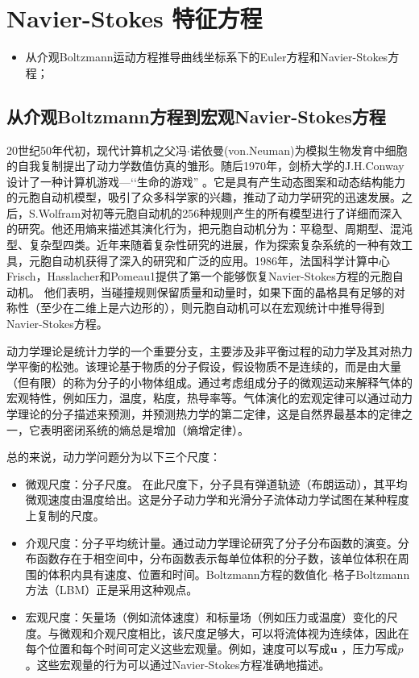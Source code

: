 \documentclass[MathematicsNumericsDerivationsAndOpenFOAM.tex]{subfiles}
\begin{document}


\chapter{Navier-Stokes 特征方程 }
\label{CHAPTER::Characteristic}

%
%
%
\begin{itemize}
  \item 从介观Boltzmann运动方程推导曲线坐标系下的Euler方程和Navier-Stokes方程；
\end{itemize}



\section{从介观Boltzmann方程到宏观Navier-Stokes方程}


20世纪50年代初，现代计算机之父冯$\cdot$诺依曼(von.Neuman)为模拟生物发育中细胞的自我复制提出了动力学数值仿真的雏形。随后1970年，剑桥大学的J.H.Conway设计了一种计算机游戏—‘‘生命的游戏” 。它是具有产生动态图案和动态结构能力的元胞自动机模型，吸引了众多科学家的兴趣，推动了动力学研究的迅速发展。之后，S.Wolfram对初等元胞自动机的256种规则产生的所有模型进行了详细而深入的研究。他还用熵来描述其演化行为，把元胞自动机分为：平稳型、周期型、混沌型、复杂型四类。近年来随着复杂性研究的进展，作为探索复杂系统的一种有效工具，元胞自动机获得了深入的研究和广泛的应用。1986年，法国科学计算中心Frisch，Hasslacher和Pomeau1提供了第一个能够恢复Navier-Stokes方程的元胞自动机。 他们表明，当碰撞规则保留质量和动量时，如果下面的晶格具有足够的对称性（至少在二维上是六边形的），则元胞自动机可以在宏观统计中推导得到Navier-Stokes方程。

动力学理论是统计力学的一个重要分支，主要涉及非平衡过程的动力学及其对热力学平衡的松弛。该理论基于物质的分子假设，假设物质不是连续的，而是由大量（但有限）的称为分子的小物体组成。通过考虑组成分子的微观运动来解释气体的宏观特性，例如压力，温度，粘度，热导率等。气体演化的宏观定律可以通过动力学理论的分子描述来预测，并预测热力学的第二定律，这是自然界最基本的定律之一，它表明密闭系统的熵总是增加（熵增定律）。


总的来说，动力学问题分为以下三个尺度：
\begin{itemize}
  \item  微观尺度：分子尺度。 在此尺度下，分子具有弹道轨迹（布朗运动），其平均微观速度由温度给出。这是分子动力学和光滑分子流体动力学试图在某种程度上复制的尺度。

  \item 介观尺度：分子平均统计量。通过动力学理论研究了分子分布函数的演变。分布函数存在于相空间中，分布函数表示每单位体积的分子数，该单位体积在周围的体积内具有速度、位置和时间。Boltzmann方程的数值化--格子Boltzmann方法（LBM）正是采用这种观点。

  \item  宏观尺度：矢量场（例如流体速度）和标量场（例如压力或温度）变化的尺度。与微观和介观尺度相比，该尺度足够大，可以将流体视为连续体，因此在每个位置和每个时间可定义这些宏观量。例如，速度可以写成$\boldsymbol{u}$ ，压力写成$p$。这些宏观量的行为可以通过Navier-Stokes方程准确地描述。
\end{itemize}
\end{document}
